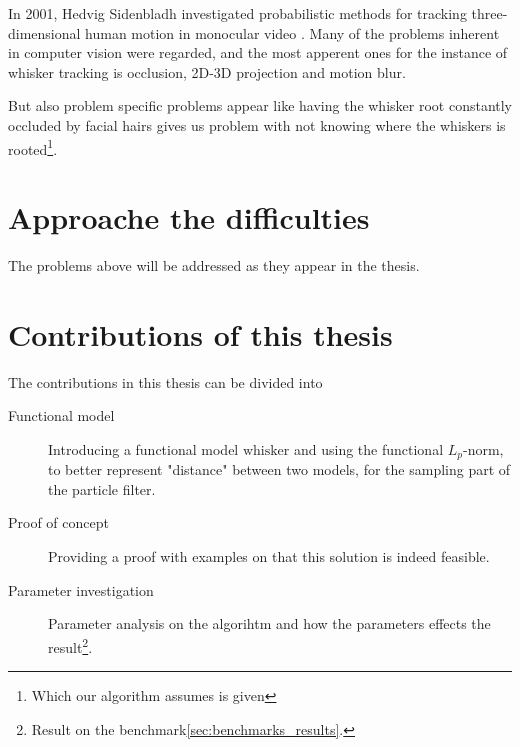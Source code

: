 In 2001, Hedvig Sidenbladh investigated probabilistic methods for tracking three-dimensional human motion in monocular video \cite{Hedvig}. 
Many of the problems inherent in computer vision were regarded, and the most apperent ones for the instance of whisker tracking is occlusion, 2D-3D projection and motion blur.

But also problem specific problems appear like having the whisker root constantly occluded by facial hairs gives us problem with not knowing where the whiskers is rooted\footnote{Which our algorithm assumes is given}.

\section{Approache the difficulties}
    The problems above will be addressed as they appear in the thesis.

\section{Contributions of this thesis}
The contributions in this thesis can be divided into
\begin{description}
    \item[Functional model] 
        Introducing a functional model $\text{whisker}$ and using the functional $L_p$-norm, 
        to better represent "distance" between two models, 
        for the sampling part of the particle filter.
    \item[Proof of concept]
        Providing a proof with examples on that this solution is indeed feasible.
    \item[Parameter investigation]
        Parameter analysis on the algorihtm and how the parameters effects the result\footnote{Result on the benchmark\ref{sec:benchmarks_results}.}.

\end{description}



